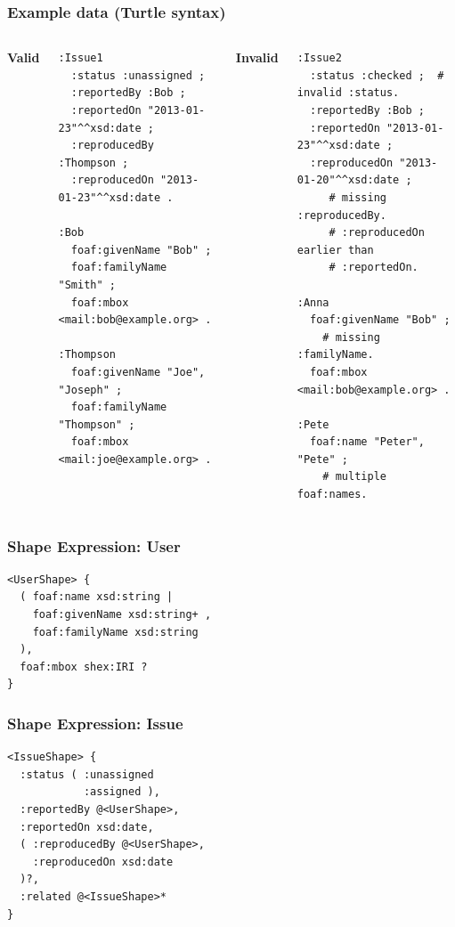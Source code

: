 \documentclass{beamer}
\begin{document}
\begin{frame}[fragile]
  \frametitle{Example data (Turtle syntax)}

  \begin{columns}

    \textbf{Valid}

  \begin{Verbatim}[fontsize=\scriptsize]
:Issue1
  :status :unassigned ;
  :reportedBy :Bob ;
  :reportedOn "2013-01-23"^^xsd:date ;
  :reproducedBy :Thompson ;
  :reproducedOn "2013-01-23"^^xsd:date .

:Bob
  foaf:givenName "Bob" ;
  foaf:familyName "Smith" ;
  foaf:mbox <mail:bob@example.org> .

:Thompson
  foaf:givenName "Joe", "Joseph" ;
  foaf:familyName "Thompson" ;
  foaf:mbox <mail:joe@example.org> .
  \end{Verbatim}


    \textbf{Invalid}

  \begin{Verbatim}[fontsize=\scriptsize]
:Issue2
  :status :checked ;  # invalid :status.
  :reportedBy :Bob ;
  :reportedOn "2013-01-23"^^xsd:date ;
  :reproducedOn "2013-01-20"^^xsd:date ;
     # missing :reproducedBy.
     # :reproducedOn earlier than
     # :reportedOn.

:Anna
  foaf:givenName "Bob" ;
    # missing :familyName.
  foaf:mbox <mail:bob@example.org> .

:Pete
  foaf:name "Peter", "Pete" ;
    # multiple foaf:names.
  \end{Verbatim}
  \end{columns}
\end{frame}

\begin{frame}[fragile]
  \frametitle{Shape Expression: User}

  \begin{Verbatim}
<UserShape> {
  ( foaf:name xsd:string |
    foaf:givenName xsd:string+ ,
    foaf:familyName xsd:string
  ),
  foaf:mbox shex:IRI ?
}
  \end{Verbatim}
\end{frame}

\begin{frame}[fragile]
  \frametitle{Shape Expression: Issue}

  \begin{Verbatim}
<IssueShape> {
  :status ( :unassigned
            :assigned ),
  :reportedBy @<UserShape>,
  :reportedOn xsd:date,
  ( :reproducedBy @<UserShape>,
    :reproducedOn xsd:date
  )?,
  :related @<IssueShape>*
}
  \end{Verbatim}
\end{frame}
\end{document}
